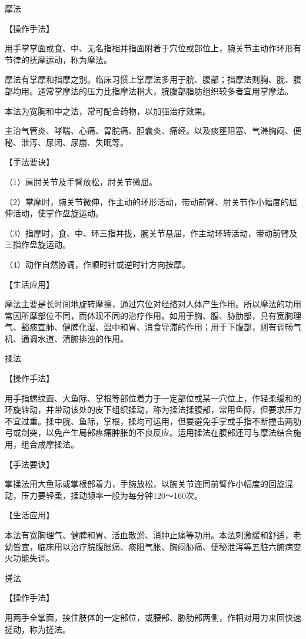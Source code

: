 \documentclass[12pt,UTF8,openany]{ctexbook}
\begin{document}
摩法

【操作手法】

用手掌掌面或食、中、无名指相并指面附着于穴位或部位上，腕关节主动作环形有节律的抚摩运动，称为摩法。

摩法有掌摩和指摩之别。临床习惯上掌摩法多用于脘、腹部；指摩法则胸、脘、腹部均用。通常掌摩法的压力比指摩法稍大，脘腹部脂肪组织较多者宜用掌摩法。

本法为宽胸和中之法，常可配合药物，以加强治疗效果。

主治气管炎、哮喘、心痛、胃脘痛、胆囊炎、痛经。以及痰壅阻塞、气滞胸闷、便秘、泄泻、尿闭、尿崩、失眠等。

【手法要诀】

（1）肩肘关节及手臂放松，肘关节微屈。

（2）掌摩时，腕关节微伸，作主动的环形活动，带动前臂、肘关节作小幅度的屈伸活动，使掌作盘旋运动。

（3）指摩时，食、中、环三指并拢，腕关节悬屈，作主动环转活动，带动前臂及三指作盘旋运动。

（4）动作自然协调，作顺时针或逆时针方向按摩。

【生活应用】

摩法主要是长时间地旋转摩擦，通过穴位对经络对人体产生作用。所以摩法的功用常因所摩部位不同，而体现不同的治疗作用。如用于胸、腹、胁肋部，具有宽胸理气、豁痰宣肺、健脾化湿、温中和胃、消食导滞的作用；用于下腹部，则有调畅气机、通调水道、清腑排浊的作用。

揉法

【操作手法】

用手指螺纹面、大鱼际、掌根等部位着力于一定部位或某一穴位上，作轻柔缓和的环旋转动，并带动该处的皮下组织揉动，称为揉法揉腹部，常用鱼际，但要求压力不宜过重。揉中脘、鱼际，掌根，揉均可运用，但要避免手掌或手指不断撞击两肋弓或剑突，以免产生局部疼痛肿胀的不良反应。运用揉法在腹部还可与摩法结合施用，组合成摩揉法。

【手法要诀】

掌揉法用大鱼际或掌根部着力，手腕放松，以腕关节连同前臂作小幅度的回旋混动，压力要轻柔，揉动频率一般为每分钟120～160次。

【生活应用】

本法有宽胸理气、健脾和胃、活血散淤、消肿止痛等功用。本法刺激缓和舒适，老幼皆宜，临床用以治疗脘腹胀痛、痰阻气胀、胸闷胁痛、便秘泄泻等五脏六腑病变火功能失调。

搓法

【操作手法】

用两手全掌面，挟住肢体的一定部位，或腰部、胁肋部两侧，作相对用力来回快速搓动，称为搓法。
\end{document}
